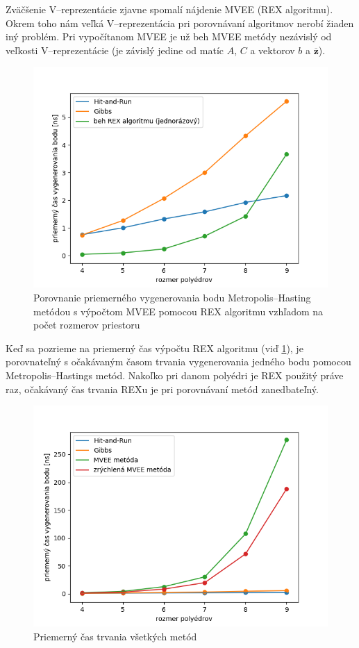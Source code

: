 Zväčšenie V--reprezentácie zjavne spomalí nájdenie MVEE (REX algoritmu). Okrem toho nám veľká V--reprezentácia pri porovnávaní algoritmov nerobí žiaden iný problém. Pri vypočítanom MVEE je už beh MVEE metódy nezávislý od veľkosti V--reprezentácie (je závislý jedine od matíc $A$, $C$ a vektorov $b$ a $\mathbf{\overline z}$).

\begin{figure} [H]
	\includegraphics[width=\linewidth]{images/mh_rex.png}
	\caption{Porovnanie priemerného vygenerovania bodu Metropolis--Hasting metódou s výpočtom MVEE pomocou REX algoritmu vzhľadom na počet rozmerov priestoru}
	\label{fig:mh_rex}
\end{figure}

Keď sa pozrieme na priemerný čas výpočtu REX algoritmu (viď \ref{fig:mh_rex}), je porovnateľný s očakávaným časom trvania vygenerovania jedného bodu pomocou Metropolis--Hastings metód. Nakoľko pri danom polyédri je REX použitý práve raz, očakávaný čas trvania REXu je pri porovnávaní metód zanedbateľný.

\begin{figure} [H]
  \includegraphics[width=\linewidth]{images/aj_zrychlena.png}
  \caption{Priemerný čas trvania všetkých metód}
  \label{fig:vsetky}
\end{figure}

